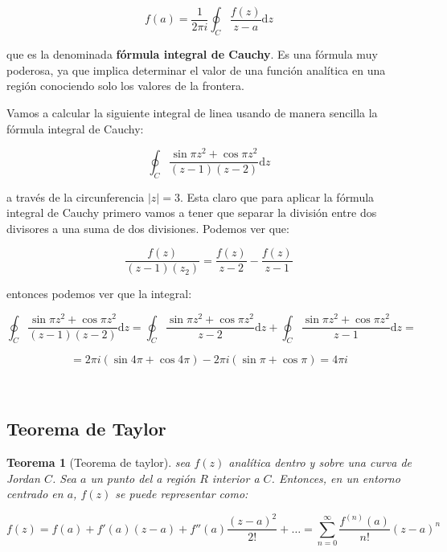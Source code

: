\documentclass[12pt]{book}
\newcommand{\D}{\mathrm{d}}
\newtheorem{theorem}{Teorema}[section]
\begin{document}
\begin{equation}
f(a) =  \frac{1}{2 \pi i} \oint_C \frac{f(z)}{z-a} \D z
\end{equation}

que es la denominada \textbf{fórmula integral de Cauchy}. Es una fórmula muy poderosa, ya que implica determinar el valor de una función analítica en una región conociendo solo los valores de la frontera. \\



\hrulefill

Vamos a calcular la siguiente integral de linea usando de manera sencilla la fórmula integral de Cauchy:

\begin{equation}
\oint_C  \frac{\sin \pi z^2 + \cos \pi z^2}{(z-1)(z-2)} \D z
\end{equation}

a través de la circunferencia $|z| = 3$. Esta claro que para aplicar la fórmula integral de Cauchy primero vamos a tener que separar la división entre dos divisores a una suma de dos divisiones. Podemos ver que:

$$ \dfrac{f(z)}{(z-1)(z_2)} = \dfrac{f(z)}{z-2} - \dfrac{f(z)}{z-1} $$


entonces podemos ver que la integral:

$$  
\oint_C  \frac{\sin \pi z^2 + \cos \pi z^2}{(z-1)(z-2)} \D z  = 
\oint_C  \frac{\sin \pi z^2 + \cos \pi z^2}{z-2} \D z + 
\oint_C  \frac{\sin \pi z^2 + \cos \pi z^2}{z-1} \D z  = $$

$$ = 2 \pi i (\sin 4\pi + \cos 4\pi) - 2 \pi i (\sin \pi + \cos \pi) = 4 \pi i  $$

\hrulefill \\

\subsection{Teorema de Taylor}

\begin{theorem}[Teorema de taylor]
sea $f(z)$ analítica dentro y sobre una curva de Jordan $C$. Sea $a$ un punto del a región $R$ interior a $C$. Entonces, en un entorno centrado en $a$, $f(z)$ se puede representar como:

$$ f(z) = f(a) + f'(a)(z-a)+f''(a) \dfrac{(z-a)^2}{2!} + \ldots = \sum_{n=0}^\infty \frac{f^{(n)}(a)}{n!} (z-a)^n $$
\end{theorem}
\end{document}
